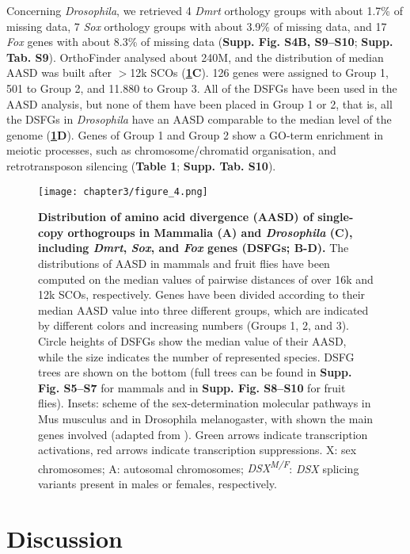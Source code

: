 \documentclass[../main.tex]{subfiles}
\begin{document}
Concerning \textit{Drosophila}, we retrieved 4 \textit{Dmrt} orthology groups with about 1.7\% of missing data, 7 \textit{Sox} orthology groups with about 3.9\% of missing data, and 17 \textit{Fox} genes with about 8.3\% of missing data (\textbf{Supp. Fig. S4B, S9--S10}; \textbf{Supp. Tab. S9}). OrthoFinder analysed about 240M, and the distribution of median AASD was built after $>$12k SCOs (\textbf{\ref{fig:DSFG_testDivergence}C}). 126 genes were assigned to Group 1, 501 to Group 2, and 11.880 to Group 3. All of the DSFGs have been used in the AASD analysis, but none of them have been placed in Group 1 or 2, that is, all the DSFGs in \textit{Drosophila} have an AASD comparable to the median level of the genome (\textbf{\ref{fig:DSFG_testDivergence}D}). Genes of Group 1 and Group 2 show a GO-term enrichment in meiotic processes, such as chromosome/chromatid organisation, and retrotransposon silencing (\textbf{Table 1}; \textbf{Supp. Tab. S10}).

\begin{figure}
    \centering
    \texttt{[image: chapter3/figure\_4.png]}
    \captionsetup{width=\textwidth}
    \caption{
    \textbf{Distribution of amino acid divergence (AASD) of single-copy orthogroups in Mammalia (A) and \textit{Drosophila} (C), including \textit{Dmrt}, \textit{Sox}, and \textit{Fox} genes (DSFGs; B-D).} The distributions of AASD in mammals and fruit flies have been computed on the median values of pairwise distances of over 16k and 12k SCOs, respectively. Genes have been divided according to their median AASD value into three different groups, which are indicated by different colors and increasing numbers (Groups 1, 2, and 3). Circle heights of DSFGs show the median value of their AASD, while the size indicates the number of represented species. DSFG trees are shown on the bottom (full trees can be found in \textbf{Supp. Fig. S5--S7} for mammals and in \textbf{Supp. Fig. S8--S10} for fruit flies). Insets: scheme of the sex-determination molecular pathways in Mus musculus and in Drosophila melanogaster, with shown the main genes involved (adapted from \textbf{\cite{beukeboom2014evolution}}). Green arrows indicate transcription activations, red arrows indicate transcription suppressions. X: sex chromosomes; A: autosomal chromosomes; \textit{DSX\textsuperscript{M/F}}: \textit{DSX} splicing variants present in males or females, respectively.
    }
    \label{fig:DSFG_testDivergence}
\end{figure}

\section{Discussion} \label{chpater3_discussion}
\end{document}
